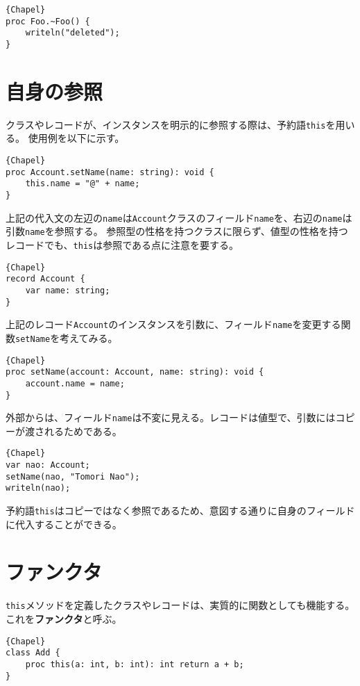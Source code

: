 \documentclass[10pt,a4paper]{book}
\begin{document}
\begin{Verbatim}{Chapel}
proc Foo.~Foo() {
	writeln("deleted");
}
\end{Verbatim}

\section{自身の参照}

クラスやレコードが、インスタンスを明示的に参照する際は、予約語\verb#this#を用いる。
使用例を以下に示す。

\begin{Verbatim}{Chapel}
proc Account.setName(name: string): void {
	this.name = "@" + name;
}
\end{Verbatim}

上記の代入文の左辺の\verb#name#は\verb#Account#クラスのフィールド\verb#name#を、右辺の\verb#name#は引数\verb#name#を参照する。
参照型の性格を持つクラスに限らず、値型の性格を持つレコードでも、\verb#this#は参照である点に注意を要する。

\begin{Verbatim}{Chapel}
record Account {
	var name: string;
}
\end{Verbatim}

上記のレコード\verb#Account#のインスタンスを引数に、フィールド\verb#name#を変更する関数\verb#setName#を考えてみる。

\begin{Verbatim}{Chapel}
proc setName(account: Account, name: string): void {
	account.name = name;
}
\end{Verbatim}

外部からは、フィールド\verb#name#は不変に見える。レコードは値型で、引数にはコピーが渡されるためである。

\begin{Verbatim}{Chapel}
var nao: Account;
setName(nao, "Tomori Nao");
writeln(nao);
\end{Verbatim}

予約語\verb#this#はコピーではなく参照であるため、意図する通りに自身のフィールドに代入することができる。

\section{ファンクタ}

\verb#this#メソッドを定義したクラスやレコードは、実質的に関数としても機能する。
これを\textbf{ファンクタ}と呼ぶ。

\begin{Verbatim}{Chapel}
class Add {
	proc this(a: int, b: int): int return a + b;
}
\end{Verbatim}
\end{document}
